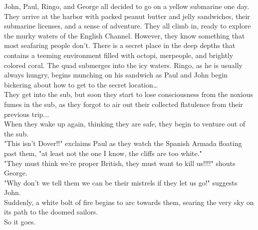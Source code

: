 \documentclass{article}
\begin{document}
John, Paul, Ringo, and George all decided to go on a yellow submarine one day.
They arrive at the harbor with packed peanut butter and jelly sandwiches,
their submarine licenses, and a sense of adventure.
They all climb in, ready to explore the murky waters of the English Channel.
However, they know something that most seafaring people don’t.
There is a secret place in the deep depths that contains a teeming environment
filled with octopi, merpeople, and brightly colored coral.
The quad submerges into the icy waters. Ringo, as he is usually always hungry,
begins munching on his sandwich as Paul and John begin bickering about how to
get to the secret location…\\

They get into the sub, but soon they start to lose consciousness from the noxious fumes in the sub, as they forgot to air out their collected flatulence from their previous trip...\\

When they wake up again, thinking they are safe, they begin to venture out of the sub.\\

"This isn't Dover!!" exclaims Paul as they watch the Spanish Armada floating past them, "at least not the one I know, the cliffs are too white."\\

"They must think we're proper British, they must want to kill us!!!!" shouts George.\\

"Why don't we tell them we can be their mistrels if they let us go!" suggests John.\\

Suddenly, a white bolt of fire begins to arc towards them, searing the very sky on its path to the doomed sailors.\\

So it goes.
\end{document}
